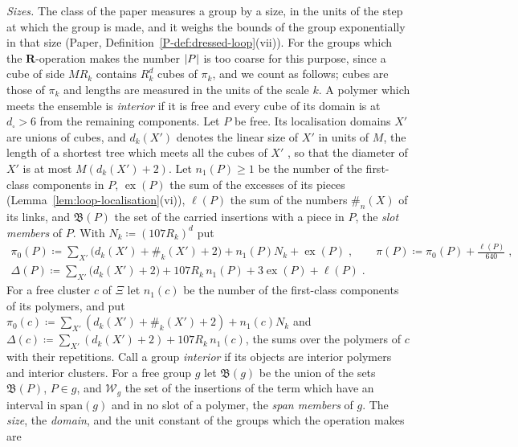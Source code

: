 \documentclass[11pt]{preprint}
\DeclarePairedDelimiter{\abs}{\lvert}{\rvert}
\numberwithin{equation}{section}
\theoremstyle{definition}
\theoremstyle{remark}
\theoremstyle{plain}
\begin{document}
\emph{Sizes.} The class of the paper measures a group by a size, in the units of the step at which the group is made, and it weighs the bounds of the group exponentially in that size (Paper, Definition~\ref{P-def:dressed-loop}(vii)). For the groups which the $\mathbf R$-operation makes the number $\abs P$ is too coarse for this purpose, since a cube of side $MR_k$ contains $R_k^d$ cubes of $\pi_k$, and we count as follows; cubes are those of $\pi_k$ and lengths are measured in the units of the scale $k$. A polymer which meets the ensemble is \emph{interior} if it is free and every cube of its domain is at $d_\square > 6$ from the remaining components. Let $P$ be free. Its localisation domains $X'$ are unions of cubes, and $d_k(X')$ denotes the linear size of $X'$ in units of $M$, the length of a shortest tree which meets all the cubes of $X'$ \cite[p.~257]{BalabanRG1}, so that the diameter of $X'$ is at most $M(d_k(X') + 2)$. Let $n_1(P) \geq 1$ be the number of the first-class components in $P$, $\operatorname{ex}(P)$ the sum of the excesses of its pieces (Lemma~\ref{lem:loop-localisation}(vi)), $\ell(P)$ the sum of the numbers $\#_n(X)$ of its links, and $\mathfrak B(P)$ the set of the carried insertions with a piece in $P$, the \emph{slot members} of $P$. With $N_k \coloneqq (107R_k)^d$ put
\begin{equation}\label{eq:r-polymer-size}
\begin{gathered}
    \pi_0(P) \coloneqq \sum_{X'}\bigl(d_k(X') + \#_k(X') + 2\bigr) + n_1(P)N_k + \operatorname{ex}(P)\;,
    \qquad
    \pi(P) \coloneqq \pi_0(P) + \frac{\ell(P)}{640}\;,\\
    \Delta(P) \coloneqq \sum_{X'}\bigl(d_k(X') + 2\bigr) + 107R_k\,n_1(P) + 3\operatorname{ex}(P) + \ell(P)\;.
\end{gathered}
\end{equation}
For a free cluster $c$ of $\Xi$ let $n_1(c)$ be the number of the first-class components of its polymers, and put $\pi_0(c) \coloneqq \sum_{X'}(d_k(X') + \#_k(X') + 2) + n_1(c)N_k$ and $\Delta(c) \coloneqq \sum_{X'}(d_k(X') + 2) + 107R_k\,n_1(c)$, the sums over the polymers of $c$ with their repetitions. Call a group \emph{interior} if its objects are interior polymers and interior clusters. For a free group $g$ let $\mathfrak B(g)$ be the union of the sets $\mathfrak B(P)$, $P \in g$, and $\mathcal W_g$ the set of the insertions of the term which have an interval in $\mathrm{span}(g)$ and in no slot of a polymer, the \emph{span members} of $g$. The \emph{size}, the \emph{domain}, and the unit constant of the groups which the operation makes are
\end{document}
